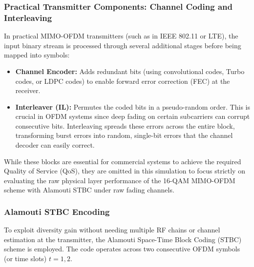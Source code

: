 \documentclass[a4paper]{article}
\begin{document}
\subsubsection{Practical Transmitter Components: Channel Coding and Interleaving}
In practical MIMO-OFDM transmitters (such as in IEEE 802.11 or LTE), the input binary stream is processed through several additional stages before being mapped into symbols:
\begin{itemize}
    \item \textbf{Channel Encoder:} Adds redundant bits (using convolutional codes, Turbo codes, or LDPC codes) to enable forward error correction (FEC) at the receiver.
    \item \textbf{Interleaver (IL):} Permutes the coded bits in a pseudo-random order. This is crucial in OFDM systems since deep fading on certain subcarriers can corrupt consecutive bits. Interleaving spreads these errors across the entire block, transforming burst errors into random, single-bit errors that the channel decoder can easily correct.
\end{itemize}
While these blocks are essential for commercial systems to achieve the required Quality of Service (QoS), they are omitted in this simulation to focus strictly on evaluating the raw physical layer performance of the 16-QAM MIMO-OFDM scheme with Alamouti STBC under raw fading channels.

\subsubsection{Alamouti STBC Encoding}
To exploit diversity gain without needing multiple RF chains or channel estimation at the transmitter, the Alamouti Space-Time Block Coding (STBC) scheme is employed. The code operates across two consecutive OFDM symbols (or time slots) $t=1, 2$.
\end{document}
